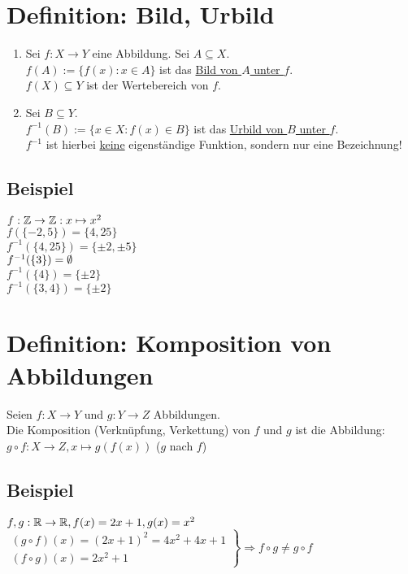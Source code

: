 \section{Definition: Bild, Urbild}\label{4.2}
\begin{enumerate}[label=(\roman*)]
\item Sei $f: X \to Y$ eine Abbildung. Sei $A \subseteq X$.\\
$f(A) := \{f(x) : x \in A\}$ ist das \underline{Bild von $A$ unter $f$}.\\
$f(X) \subseteq Y$ ist der Wertebereich von $f$.
\item Sei $B \subseteq Y$.\\
$f^{-1}(B) := \{x \in X : f(x) \in B\}$ ist das \underline{Urbild von $B$ unter $f$}.\\
$f^{-1}$ ist hierbei \underline{keine} eigenständige Funktion, sondern nur eine Bezeichnung!
\end{enumerate}

\subsection*{Beispiel}
$f: \mathbb{Z} \to \mathbb{Z}: x \mapsto x^2$\\
$f(\{-2,5\})=\{4,25\}$\\
$f^{-1}(\{4,25\})=\{\pm 2,\pm 5\}$\\
$f^{-1}(\{3\})=\emptyset$\\
$f^{-1}(\{4\})=\{\pm 2\}$\\
$f^{-1}(\{3,4\})=\{\pm 2\}$

\newpage

\section{Definition: Komposition von Abbildungen}\label{4.3}
Seien $f: X \to Y$ und $g: Y \to Z$ Abbildungen.\\
Die Komposition (Verknüpfung, Verkettung) von $f$ und $g$ ist die Abbildung:\\
$g \circ f: X \to Z, x \mapsto g(f(x))$ ($g$ nach $f$)

\subsection*{Beispiel}
$f,g : \mathbb{R} \to \mathbb{R}, f(x)=2x+1, g(x)=x^2$\\
$\left. \begin{array}{l}
(g \circ f)(x) = (2x+1)^2=4x^2+4x+1\\
(f \circ g)(x) = 2x^2+1
\end{array} \right \} \Rightarrow f \circ g \neq g \circ f$


